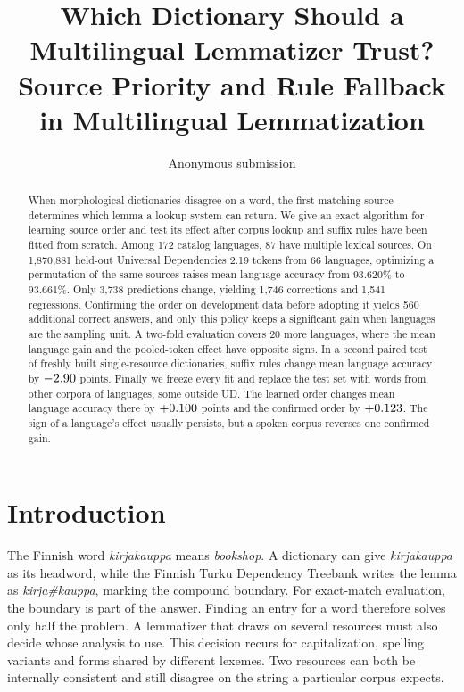 \documentclass[11pt]{article}
\title{Which Dictionary Should a Multilingual Lemmatizer Trust?\\
Source Priority and Rule Fallback in Multilingual Lemmatization}
\author{Anonymous submission}
\begin{document}
\maketitle

\begin{abstract}
When morphological dictionaries disagree on a word, the first matching
source determines which lemma a lookup system can return. We give an exact
algorithm for learning source order and test its effect after corpus lookup
and suffix rules have been fitted from scratch. Among 172 catalog languages,
87 have multiple lexical sources. On 1,870,881 held-out Universal Dependencies
2.19 tokens from 66 languages, optimizing a permutation of the same sources
raises mean language accuracy from 93.620\% to 93.661\%. Only 3,738 predictions
change, yielding 1,746 corrections and 1,541 regressions. Confirming the order
on development data before adopting it yields 560 additional correct answers,
and only this policy keeps a significant gain when languages are the
sampling unit. A two-fold evaluation covers 20 more languages, where
the mean language gain and the pooled-token effect have opposite signs. In a
second paired test of freshly built single-resource dictionaries, suffix rules
change mean language accuracy by $-2.90$ points. Finally we freeze every
fit and replace the test set with \trOffN{} words from other corpora of
\trOffLang{} languages, some outside UD. The learned order changes mean
language accuracy there by $+0.100$ points and the confirmed order by
$+0.123$. The sign of a language's effect usually persists, but a spoken
corpus reverses one confirmed gain.

\end{abstract}

\section{Introduction}

The Finnish word \emph{kirjakauppa} means \emph{bookshop}. A dictionary can
give \emph{kirjakauppa} as its headword, while the Finnish Turku Dependency
Treebank writes the lemma as \emph{kirja\#kauppa}, marking the compound
boundary. For exact-match evaluation, the boundary is part of the answer.
Finding an entry for a word therefore solves only half the problem. A
lemmatizer that draws on several resources must also decide whose analysis to
use. This decision recurs for capitalization, spelling variants and forms
shared by different lexemes. Two resources can both be internally consistent
and still disagree on the string a particular corpus expects.
\end{document}
